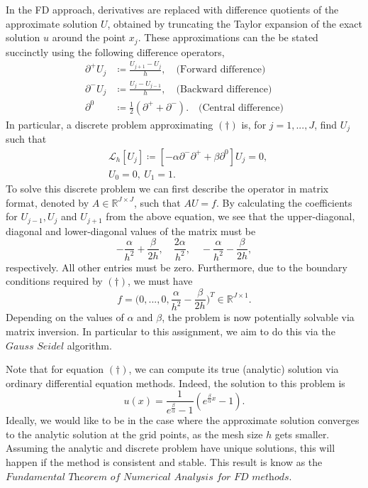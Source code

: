\documentclass[10pt]{article}
\begin{document}
In the FD approach, derivatives are replaced with difference quotients of the approximate solution $U$, obtained by truncating the Taylor expansion of the exact solution $u$ around the point $x_j$. These approximations can the be stated succinctly using the following difference operators,
\begin{align*}
    \partial^+U_j &\coloneqq \frac{U_{j+1} - U_j}{h}, \quad \text{(Forward difference)} \\
    \partial^-U_j &\coloneqq \frac{U_j - U_{j-1}}{h}, \quad \text{(Backward difference)} \\
    \partial^0 &\coloneqq \frac{1}{2}(\partial^+ + \partial^-). \quad \text{(Central difference)}
\end{align*}
In particular, a discrete problem approximating $(\dagger)$ is, for $j=1,...,J$, find $U_j$ such that
\begin{align*}
&\mathcal{L}_h[U_j] \coloneqq[-\alpha \partial^-\partial^+ + \beta \partial^0]U_j = 0, \\
&U_0 = 0,~U_1 = 1.
\end{align*}
To solve this discrete problem we can first describe the operator in matrix format, denoted by $A \in \mathbb{R}^{J\times J}$, such that $AU=f$. By calculating the coefficients for $U_{j-1},U_j$ and $U_{j+1}$ from the above equation, we see that the upper-diagonal, diagonal and lower-diagonal values of the matrix must be
\[ -\frac{\alpha}{h^2} + \frac{\beta}{2h}, \quad
\frac{2 \alpha}{h^2}, \quad
-\frac{\alpha}{h^2} - \frac{\beta}{2h}, \]
respectively. All other entries must be zero. Furthermore, due to the boundary conditions required by $(\dagger)$, we must have
\[ f = \Big(0,...,0,\frac{\alpha}{h^2} - \frac{\beta}{2h}\Big)^T \in \mathbb{R}^{J \times 1}.\]
Depending on the values of $\alpha$ and $\beta$, the problem is now potentially solvable via matrix inversion. In particular to this assignment, we aim to do this via the $\textit{Gauss Seidel}$ algorithm.

Note that for equation $(\dagger)$, we can compute its true (analytic) solution via ordinary differential equation methods. Indeed, the solution to this problem is
\[ u(x) = \frac{1}{e^{\frac{\beta}{\alpha}} - 1}(e^{\frac{\beta}{\alpha}x} -1). \]
Ideally, we would like to be in the case where the approximate solution converges to the analytic solution at the grid points, as the mesh size $h$ gets smaller. Assuming the analytic and discrete problem have unique solutions, this will happen if the method is consistent and stable. This result is know as the $\textit{Fundamental Theorem of Numerical Analysis for FD methods}$.
\end{document}
